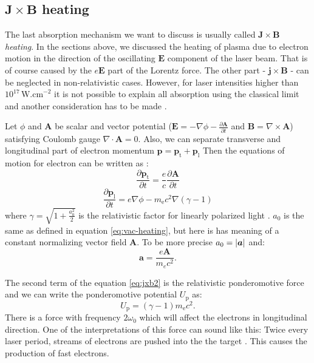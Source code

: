 \subsection*{$\bm{J}\times \bm{B}$ heating}
The last absorption mechanism we want to discuss is usually called $\bm{J}\times \bm{B}$ \textit{heating}. In the sections above, we discussed the heating of plasma due to electron motion in the direction of the oscillating $\bm{E}$ component of the laser beam. That is of course caused by the $e\bm{E}$ part of the Lorentz force. The other part - $\bm{j \times B}$ - can be neglected in non-relativistic cases. However, for laser intensities higher than $10^{17}\,\mathrm{W.cm}^{-2}$ it is not possible to explain all absorption using the classical limit and another consideration has to be made \cite{cai2006}.

Let $\phi$ and $\bm{A}$ be scalar and vector potential ($\bm{E} = -\nabla \phi -\frac{\partial \bm{A}}{\partial t}$ and $\bm{B} = \nabla \times \bm{A}$) satisfying Coulomb gauge $\nabla \cdot \bm{A} = 0$. Also, we can separate transverse and longitudinal part of electron momentum $\bm{p} = \bm{p}_\mathrm{t}+\bm{p}_\mathrm{l}$  Then the equations of motion for electron can be written as \cite{cai2006}:
\begin{equation}
	\frac{\partial \bm{p}_\mathrm{t}}{\partial t} = \frac{e}{c} \frac{\partial \bm{A}}{\partial t}
	\label{eq:jxb1}
\end{equation}
\begin{equation}
	\frac{\partial \bm{p}_\mathrm{l}}{\partial t} = e\nabla \phi - m_{\mathrm{e}}c^2\nabla (\gamma-1)
	\label{eq:jxb2}
\end{equation}
where $\gamma = \sqrt{1+\frac{a_0^2}{2}}$ is the relativistic factor for linearly polarized light \cite{absorption2}. $a_0$ is the same as defined in equation \ref{eq:vac-heating}, but here is has meaning of a constant normalizing vector field $\bm{A}$. To be more precise $a_0 = \lvert \bm{a} \rvert$ and:
\begin{equation}
	\bm{a} = \frac{e\bm{A}}{m_ec^2}.
\end{equation}

The second term of the equation \ref{eq:jxb2} is the relativistic ponderomotive force and we can write the ponderomotive potential $U_\mathrm{p}$ as:
\begin{equation}
	U_\mathrm{p} = (\gamma - 1)m_{\mathrm{e}}c^2.
	\label{eq:ponderomotive-potential}
\end{equation}
There is a force with frequency $2\omega_0$ which will affect the electrons in longitudinal direction. One of the interpretations of this force can sound like this: Twice every laser period, streams of electrons are pushed into the the target \cite{cai2006}. This causes the production of fast electrons.

